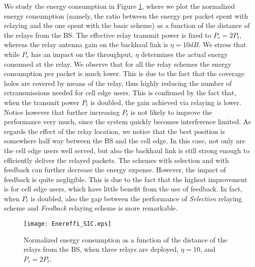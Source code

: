 \documentclass[12pt, letterpaper, onecolumn, draftcls]{IEEEtran}
\newcommand{\figw}{0.55\columnwidth}
\begin{document}
We study the energy consumption in Figure \ref{fig:Enereffi_SIC}, where we plot the normalized energy consumption (namely, the ratio between the energy per packet spent with relaying and the one spent with the basic scheme) as a function of the distance of the relays from the BS. The effective relay transmit power is fixed to $P_r = 2P_t$, whereas the relay antenna gain on the backhaul link is $\eta = 10 dB$.
We stress that while $P_r$ has an impact on the throughput, $\eta$ determines the actual energy consumed at the relay. We observe that for all the relay schemes the energy consumption per packet is much lower. This is due to the fact that the coverage holes are covered by means of the relay, thus highly reducing the number of retransmissions needed for cell edge users. This is confirmed by the fact that, when the transmit power $P_t$ is doubled, the gain achieved via relaying is lower.
Notice however that further increasing $P_t$ is not likely to improve the performance very much, since the system quickly becomes interference limited.
As regards the effect of the relay location, we notice that the best position is somewhere half way between the BS and the cell edge. In this case, not only are the cell edge users well served, but also the backhaul link is still strong enough to efficiently deliver the relayed packets.
The schemes with selection and with feedback can further decrease the energy expense. However, the impact of feedback is quite negligible. This is due to the fact that the highest improvement is for cell edge users, which have little benefit from the use of feedback. In fact, when $P_t$ is doubled, also the gap between the performance of \textit{Selection} relaying scheme and \textit{Feedback} relaying scheme is more remarkable.
\begin{figure}
    \centering
    \texttt{[image: Enereffi\_SIC.eps]}
     \caption{\small Normalized energy consumption as a function of the distance of the relays from the BS, when three relays are deployed, $\eta=10$, and $P_r = 2P_t$.}
     \vspace{-1cm}
  \label{fig:Enereffi_SIC}
\end{figure}
\end{document}
